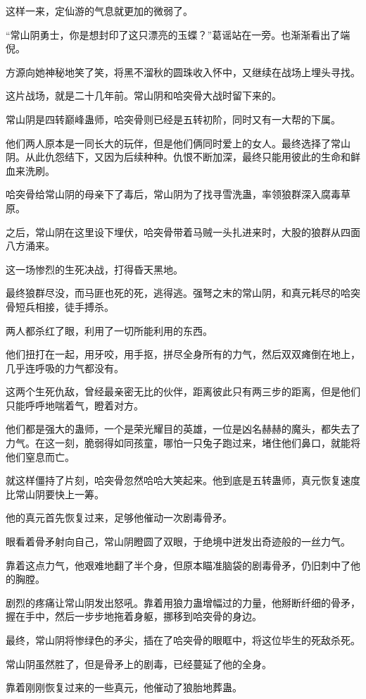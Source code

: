 \begin{this_body}
这样一来，定仙游的气息就更加的微弱了。

“常山阴勇士，你是想封印了这只漂亮的玉蝶？”葛谣站在一旁。也渐渐看出了端倪。

方源向她神秘地笑了笑，将黑不溜秋的圆珠收入怀中，又继续在战场上埋头寻找。

这片战场，就是二十几年前。常山阴和哈突骨大战时留下来的。

常山阴是四转巅峰蛊师，哈突骨则已经是五转初阶，同时又有一大帮的下属。

他们两人原本是一同长大的玩伴，但是他们俩同时爱上的女人。最终选择了常山阴。从此仇怨结下，又因为后续种种。仇恨不断加深，最终只能用彼此的生命和鲜血来洗刷。

哈突骨给常山阴的母亲下了毒后，常山阴为了找寻雪洗蛊，率领狼群深入腐毒草原。

之后，常山阴在这里设下埋伏，哈突骨带着马贼一头扎进来时，大股的狼群从四面八方涌来。

这一场惨烈的生死决战，打得昏天黑地。

最终狼群尽没，而马匪也死的死，逃得逃。强弩之末的常山阴，和真元耗尽的哈突骨短兵相接，徒手搏杀。

两人都杀红了眼，利用了一切所能利用的东西。

他们扭打在一起，用牙咬，用手抠，拼尽全身所有的力气，然后双双瘫倒在地上，几乎连呼吸的力气都没有。

这两个生死仇敌，曾经最亲密无比的伙伴，距离彼此只有两三步的距离，但是他们只能呼呼地喘着气，瞪着对方。

他们都是强大的蛊师，一个是荣光耀目的英雄，一位是凶名赫赫的魔头，都失去了力气。在这一刻，脆弱得如同孩童，哪怕一只兔子跑过来，堵住他们鼻口，就能将他们窒息而亡。

就这样僵持了片刻，哈突骨忽然哈哈大笑起来。他到底是五转蛊师，真元恢复速度比常山阴要快上一筹。

他的真元首先恢复过来，足够他催动一次剧毒骨矛。

眼看着骨矛射向自己，常山阴瞪圆了双眼，于绝境中迸发出奇迹般的一丝力气。

靠着这点力气，他艰难地翻了半个身，但原本瞄准脑袋的剧毒骨矛，仍旧刺中了他的胸膛。

剧烈的疼痛让常山阴发出怒吼。靠着用狼力蛊增幅过的力量，他掰断纤细的骨矛，握在手中，然后一步步地拖着身躯，挪移到哈突骨的身边。

最终，常山阴将惨绿色的矛尖，插在了哈突骨的眼眶中，将这位毕生的死敌杀死。

常山阴虽然胜了，但是骨矛上的剧毒，已经蔓延了他的全身。

靠着刚刚恢复过来的一些真元，他催动了狼胎地葬蛊。


\end{this_body}

